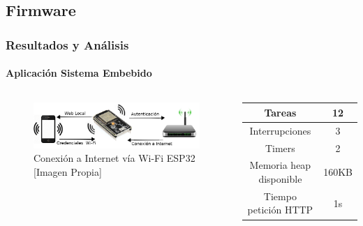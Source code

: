 \subsection{Firmware}
\begin{frame}
\frametitle{Resultados y Análisis}
\framesubtitle{Aplicación Sistema Embebido}
\begin{columns}
\begin{figure}
	\centering
	\caption{Conexión a Internet vía Wi-Fi ESP32 [Imagen Propia]}
	\label{fig:conexion}
	\includegraphics[width=\linewidth]{Imagenes/conexion}
\end{figure}
	
	\begin{tabular}{|c|c|}
		\hline 
		Tareas & 12 \\ 
		\hline 
		Interrupciones & 3 \\
		\hline
		Timers & 2 \\ 
		\hline 
		Memoria heap disponible & 160KB \\ 
		\hline 
		Tiempo petición HTTP & 1s \\ 
		\hline 
	\end{tabular} 
	
\end{columns}
\end{frame}

